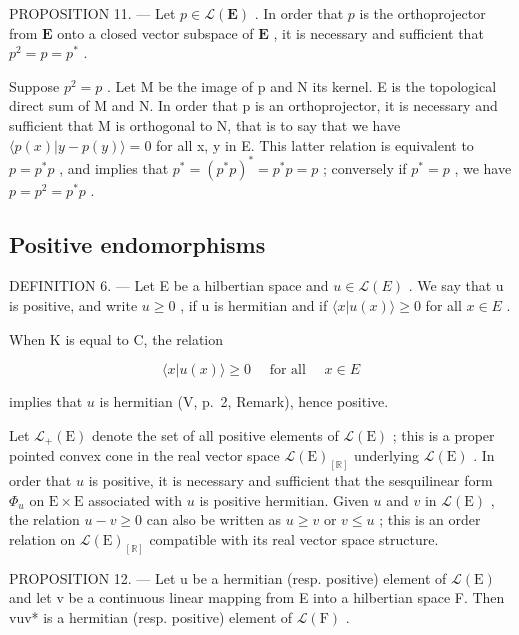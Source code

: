 PROPOSITION 11. --- Let \(p \in \mathcal{L}(\mathbf{E})\) . In order that \(p\) is the orthoprojector from \(\mathbf{E}\) onto a closed vector subspace of \(\mathbf{E}\) , it is necessary and sufficient that \(p^2 = p = p^*\) .

Suppose \(p^{2} = p\) . Let M be the image of p and N its kernel. E is the topological direct sum of M and N. In order that p is an orthoprojector, it is necessary and sufficient that M is orthogonal to N, that is to say that we have \(\langle p(x)|y - p(y)\rangle = 0\) for all x, y in E. This latter relation is equivalent to \(p = p^{*}p\) , and implies that \(p^{*} = (p^{*}p)^{*} = p^{*}p = p\) ; conversely if \(p^{*} = p\) , we have \(p = p^{2} = p^{*}p\) .

\subsection{Positive endomorphisms}

DEFINITION 6. --- Let E be a hilbertian space and \(u \in \mathcal{L}(E)\) . We say that u is positive, and write \(u \geqslant 0\) , if u is hermitian and if \(\langle x|u(x) \rangle \geqslant 0\) for all \(x \in E\) .

When K is equal to C, the relation

\[
\langle x | u (x) \rangle \geqslant 0 \quad \text { for   all } \quad x \in E
\]

implies that \(u\) is hermitian (V, p.~2, Remark), hence positive.

Let \(\mathcal{L}_{+}(\mathrm{E})\) denote the set of all positive elements of \(\mathcal{L}(\mathrm{E})\) ; this is a proper pointed convex cone in the real vector space \(\mathcal{L}(\mathrm{E})_{[\mathbb{R}]}\) underlying \(\mathcal{L}(\mathrm{E})\) . In order that \(u\) is positive, it is necessary and sufficient that the sesquilinear form \(\Phi_u\) on \(\mathrm{E} \times \mathrm{E}\) associated with \(u\) is positive hermitian. Given \(u\) and \(v\) in \(\mathcal{L}(\mathrm{E})\) , the relation \(u - v \geqslant 0\) can also be written as \(u \geqslant v\) or \(v \leqslant u\) ; this is an order relation on \(\mathcal{L}(\mathrm{E})_{[\mathbb{R}]}\) compatible with its real vector space structure.

PROPOSITION 12. --- Let u be a hermitian (resp. positive) element of \(\mathcal{L}(\mathrm{E})\) and let v be a continuous linear mapping from E into a hilbertian space F. Then vuv* is a hermitian (resp. positive) element of \(\mathcal{L}(\mathrm{F})\) .

